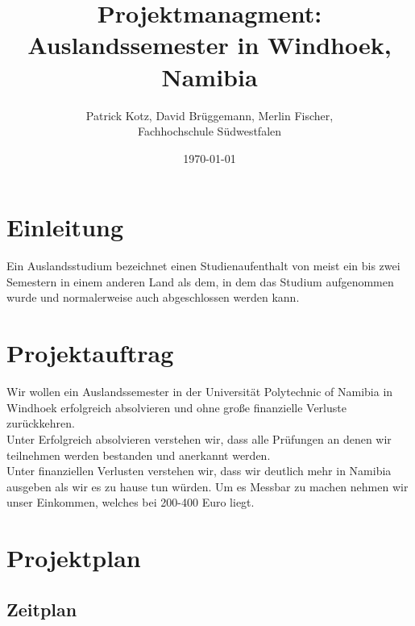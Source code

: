 \documentclass[11pt]{article}
\begin{document}
\begin{titlepage}
\begin{center}
  \title{Projektmanagment: \\Auslandssemester in Windhoek, Namibia}
  \author{Patrick Kotz, David Brüggemann, Merlin Fischer,\\ Fachhochschule Südwestfalen}
  \date{\today}
\end{center}
\end{titlepage}

\fancyfoot[C]{}
\newpage

\tableofcontents
\newpage

\maketitle

\newpage
\tableofcontents
\newpage

\fancyfoot[C]{\thepage}

\section{Einleitung}
Ein Auslandsstudium bezeichnet einen Studienaufenthalt von meist ein bis zwei Semestern in einem anderen Land als dem, in dem das Studium aufgenommen wurde und normalerweise auch abgeschlossen werden kann.

\section{Projektauftrag}
Wir wollen ein Auslandssemester in der Universität Polytechnic of Namibia in Windhoek erfolgreich absolvieren und ohne große finanzielle Verluste zurückkehren.\\

Unter Erfolgreich absolvieren verstehen wir, dass alle Prüfungen an denen wir teilnehmen werden bestanden und anerkannt werden.\\

Unter finanziellen Verlusten verstehen wir, dass wir deutlich mehr in Namibia ausgeben als wir es zu hause tun würden. Um es Messbar zu machen nehmen wir unser Einkommen, welches bei 200-400 Euro liegt.

\newpage

\section{Projektplan}

\subsection{Zeitplan}
\end{document}

